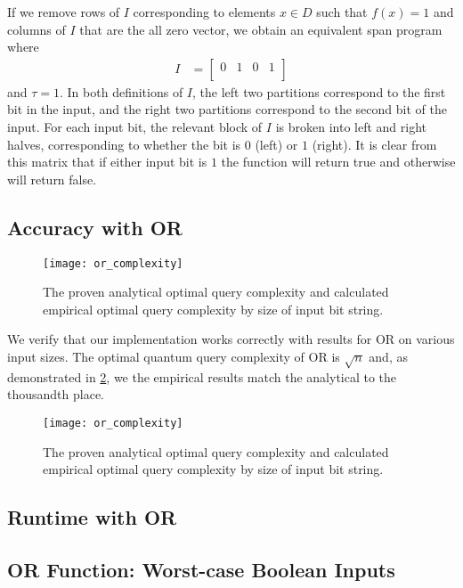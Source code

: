 If we remove rows of $I$ corresponding to elements 
$ x \in D$ such that $f(x) = 1$
and columns of $I$ that are the 
all zero vector, we obtain an equivalent span program where
\begin{align}
I &= \left[\begin{array}{cccc}
   0 & 1 & 0 & 1 \\
\end{array} \right] \nonumber
\end{align}
and $\tau = 1$.
In both definitions of $I$, the left two partitions
correspond to the first bit in the
input, and the right two partitions correspond 
to the second bit of the input. For each
input bit, the relevant block of $I$ 
is broken into left and right halves, corresponding
to whether the bit is $0$ (left) or $1$ (right). 
It is clear from this matrix that if either input bit is
$1$ the function will return true and otherwise
will return false.

\subsection{Accuracy with OR}

\begin{figure}[H]
\centering
\texttt{[image: or\_complexity]}
\caption{The proven analytical optimal query complexity
and calculated empirical optimal query complexity by 
size of input bit string.}
\label{fig:or_complexity}
\end{figure}

We verify that our implementation works correctly
with results for OR on various input sizes.
The optimal quantum query complexity of OR
is $\sqrt{n}$ and, as demonstrated in
\cref{fig:or_complexity},
we the empirical results match the analytical
to the thousandth place.

\begin{figure}[H]
\centering
\texttt{[image: or\_complexity]}
\caption{The proven analytical optimal query complexity
and calculated empirical optimal query complexity by 
size of input bit string.}
\label{fig:or_complexity}
\end{figure}

\subsection{Runtime with OR}

\subsection{OR Function: Worst-case Boolean Inputs}\label{sec:speed}



